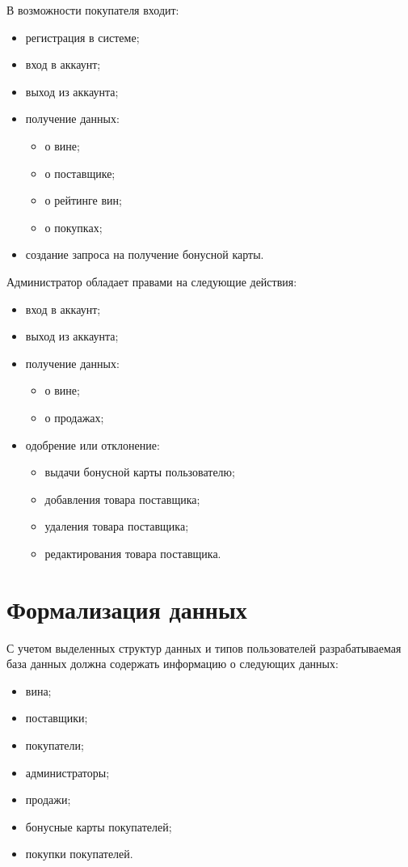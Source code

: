 В возможности покупателя входит:

\begin{itemize}
	\item регистрация в системе;
	\item вход в аккаунт;
	\item выход из аккаунта;
	\item получение данных:
		\begin{itemize}
			\item о вине;
			\item о поставщике;
			\item о рейтинге вин;
			\item о покупках;
		\end{itemize}
	\item создание запроса на получение бонусной карты.
\end{itemize}

Администратор обладает правами на следующие действия:

\begin{itemize}
	\item вход в аккаунт;
	\item выход из аккаунта;
	\item получение данных:
		\begin{itemize}
			\item о вине;
			\item о продажах;
		\end{itemize}
	\item одобрение или отклонение:
		\begin{itemize}
			\item выдачи бонусной карты пользователю;
			\item добавления товара поставщика;
			\item удаления товара поставщика;
			\item редактирования товара поставщика.
		\end{itemize}
\end{itemize}

\section{Формализация данных}

С учетом выделенных структур данных и типов пользователей разрабатываемая база данных должна содержать информацию о следующих данных:

\begin{itemize}
	\item вина;
	\item поставщики;
	\item покупатели;
	\item администраторы;
	\item продажи;
	\item бонусные карты покупателей;
	\item покупки покупателей.	
\end{itemize}

